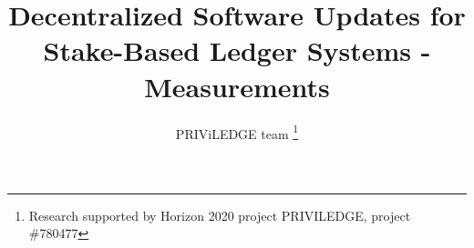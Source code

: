\title{Decentralized Software Updates for Stake-Based Ledger Systems - Measurements}
\author{PRIViLEDGE team
        \fnmsep \thanks{Research supported by Horizon 2020 project PRIVILEDGE, project \#780477}}
\maketitle
